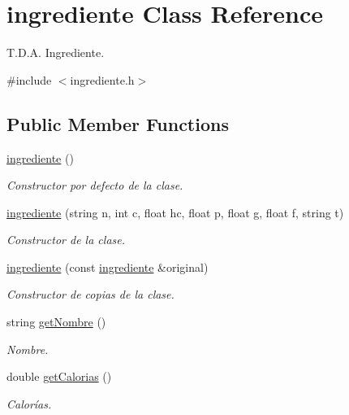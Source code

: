 \hypertarget{classingrediente}{}\section{ingrediente Class Reference}
\label{classingrediente}


T.\+D.\+A. Ingrediente.  




{\ttfamily \#include $<$ingrediente.\+h$>$}

\subsection*{Public Member Functions}
\begin{DoxyCompactItemize}
\item 
\hyperlink{classingrediente_a4f2c8e16106eb4cf5a8ad9695d7a3809}{ingrediente} ()
\begin{DoxyCompactList}\small\item\em Constructor por defecto de la clase. \end{DoxyCompactList}\item 
\hyperlink{classingrediente_af1786aa0950f0d9168ad051d4225622f}{ingrediente} (string n, int c, float hc, float p, float g, float f, string t)
\begin{DoxyCompactList}\small\item\em Constructor de la clase. \end{DoxyCompactList}\item 
\hyperlink{classingrediente_ae9895931693d316de6db95820994fa91}{ingrediente} (const \hyperlink{classingrediente}{ingrediente} \&original)
\begin{DoxyCompactList}\small\item\em Constructor de copias de la clase. \end{DoxyCompactList}\item 
string \hyperlink{classingrediente_a1bb43a7c4f04f6ef9b85cb599248fb8e}{get\+Nombre} ()
\begin{DoxyCompactList}\small\item\em Nombre. \end{DoxyCompactList}\item 
double \hyperlink{classingrediente_ad30d67f12692a2646c6a989e65770f09}{get\+Calorias} ()
\begin{DoxyCompactList}\small\item\em Calorías. \end{DoxyCompactList}\item 

\end{DoxyCompactItemize}
